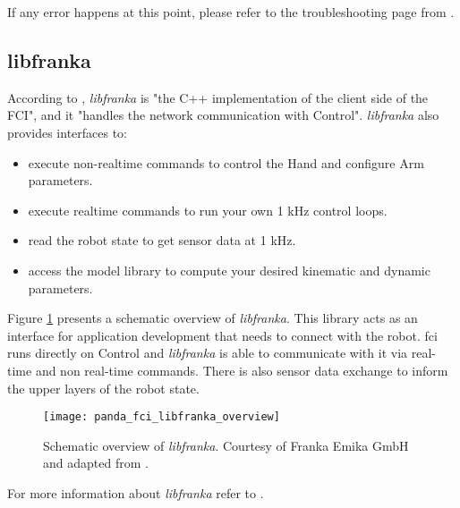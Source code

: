 If any error happens at this point, please refer to the troubleshooting page from \cite{FrankaEmikaGmbH_fci_documentation}.


\subsection{libfranka}
\label{subsec:ros_setup_robotic_system_integration_ros_libfranka}

According to \cite{FrankaEmikaGmbH_fci_documentation}, \textit{libfranka} is "the C++ implementation of the client side of the FCI", and it "handles the network communication with Control". \textit{libfranka} also provides interfaces to:

\begin{itemize}
    \item execute non-realtime commands to control the Hand and configure Arm parameters.
    \item execute realtime commands to run your own 1 kHz control loops.
    \item read the robot state to get sensor data at 1 kHz.
    \item access the model library to compute your desired kinematic and dynamic parameters.
\end{itemize}

Figure \ref{fig:panda_fci_libfranka_overview} presents a schematic overview of \textit{libfranka}. This library acts as an interface for application development that needs to connect with the robot. \gls{fci} runs directly on Control and \textit{libfranka} is able to communicate with it via real-time and non real-time commands. There is also sensor data exchange to inform the upper layers of the robot state.

\begin{figure}[htbp]
    \centering
	\texttt{[image: panda\_fci\_libfranka\_overview]}
	\caption[Schematic overview of \textit{libfranka}.]{Schematic overview of \textit{libfranka}. Courtesy of Franka Emika GmbH and adapted from \cite{FrankaEmikaGmbH_fci_documentation}.}
	\label{fig:panda_fci_libfranka_overview}
\end{figure}

For more information about \textit{libfranka} refer to \cite{FrankaEmikaGmbH_fci_documentation}.


